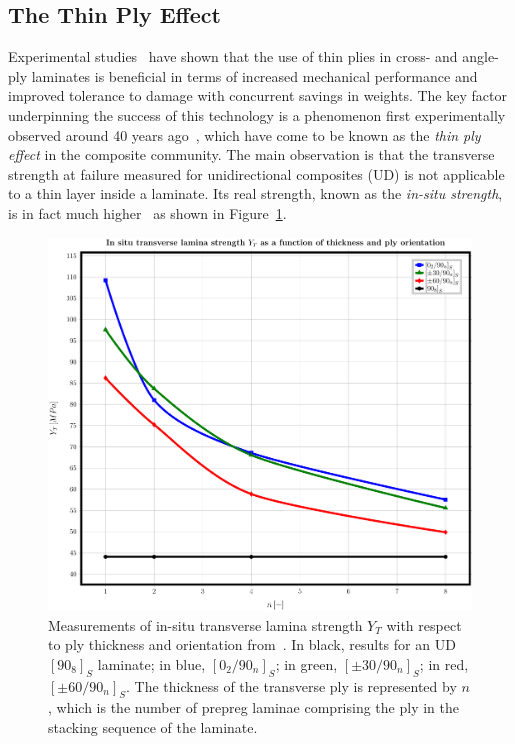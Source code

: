 \documentclass[a4paper]{jpconf}
\begin{document}
\subsection{The Thin Ply Effect}
Experimental studies~\cite{SihnKimKawabeTsai:2007,SaitoTakeuchKimpara:2012,ArteiroCatalanottiXavierCamanho:2013,AmacherCugnoniBotsisSorensenSmithDransfeld:2014} have shown that the use of thin plies in cross- and angle-ply laminates is beneficial in terms of increased mechanical performance and improved tolerance to damage with concurrent savings in weights. The key factor underpinning the success of this technology is a phenomenon first experimentally observed around 40 years ago~\cite{ParviziBailey:1978,BaileyCurtisParvizi:1979}, which have come to be known as the \textit{thin ply effect} in the composite community. The main observation is that the transverse strength at failure measured for unidirectional composites (UD) is not applicable to a thin layer inside a laminate. Its real strength, known as the \textit{in-situ strength}, is in fact much higher~\cite{FlaggsKural:1982} as shown in Figure~\ref{fig:insitustrength}.\par
\begin{figure}
\begin{center}
\includegraphics[height=0.4\textheight]{Flaggs-Kural_InSituTransverseStrength.pdf}
\end{center}
\caption{\label{fig:insitustrength}Measurements of in-situ transverse lamina strength $Y_{T}$ with respect to ply thickness and orientation from~\cite{FlaggsKural:1982}. In black, results for an UD $\left[90_{8}\right]_{S}$ laminate; in blue, $\left[0_{2}/90_{n}\right]_{S}$; in green, $\left[\pm30/90_{n}\right]_{S}$; in red, $\left[\pm60/90_{n}\right]_{S}$. The thickness of the transverse ply is represented by $n$, which is the number of prepreg laminae comprising the ply in the stacking sequence of the laminate.}
\end{figure}
\end{document}
